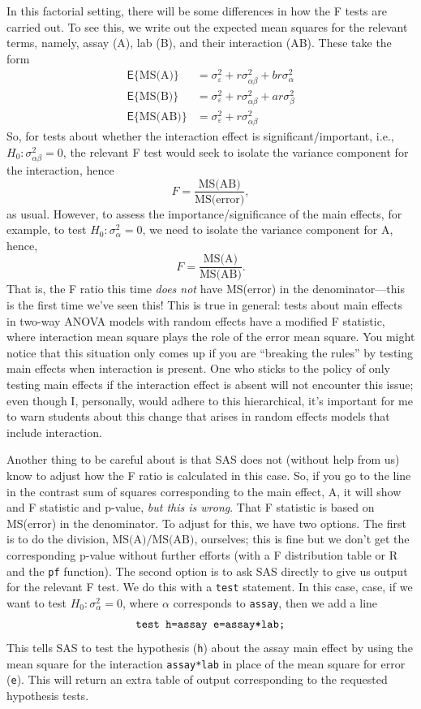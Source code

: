 \documentclass[a4paper, 12pt]{article}
\theoremstyle{plain}
\theoremstyle{definition}
\theoremstyle{remark}
\newcommand{\E}{\mathsf{E}}
\newcommand{\eps}{\varepsilon}
\begin{document}
In this factorial setting, there will be some differences in how the F tests are carried out.  To see this, we write out the expected mean squares for the relevant terms, namely, assay (A), lab (B), and their interaction (AB).  These take the form 
\begin{align*}
\E\{\text{MS(A)}\} & = \sigma_\eps^2 + r \sigma_{\alpha\beta}^2 + br \sigma_\alpha^2 \\
\E\{\text{MS(B)}\} & = \sigma_\eps^2 + r \sigma_{\alpha\beta}^2 + ar \sigma_\beta^2 \\
\E\{\text{MS(AB)}\} & = \sigma_\eps^2 + r \sigma_{\alpha\beta}^2 
\end{align*}
So, for tests about whether the interaction effect is significant/important, i.e., $H_0: \sigma_{\alpha\beta}^2 = 0$, the relevant F test would seek to isolate the variance component for the interaction, hence 
\[ F = \frac{\text{MS(AB)}}{\text{MS(error)}}, \]
as usual.  However, to assess the importance/significance of the main effects, for example, to test $H_0: \sigma_\alpha^2 = 0$, we need to isolate the variance component for A, hence, 
\[ F = \frac{\text{MS(A)}}{\text{MS(AB)}}. \]
That is, the F ratio this time {\em does not} have MS(error) in the denominator---this is the first time we've seen this!  This is true in general: tests about main effects in two-way ANOVA models with random effects have a modified F statistic, where interaction mean square plays the role of the error mean square.  You might notice that this situation only comes up if you are ``breaking the rules'' by testing main effects when interaction is present.  One who sticks to the policy of only testing main effects if the interaction effect is absent will not encounter this issue; even though I, personally, would adhere to this hierarchical, it's important for me to warn students about this change that arises in random effects models that include interaction.  

Another thing to be careful about is that SAS does not (without help from us) know to adjust how the F ratio is calculated in this case.  So, if you go to the line in the contrast sum of squares corresponding to the main effect, A, it will show and F statistic and p-value, {\em but this is wrong}.  That F statistic is based on MS(error) in the denominator.  To adjust for this, we have two options.  The first is to do the division, $\text{MS(A)}/\text{MS(AB)}$, ourselves; this is fine but we don't get the corresponding p-value without further efforts (with a F distribution table or R and the {\tt pf} function).  The second option is to ask SAS directly to give us output for the relevant F test.  We do this with a {\tt test} statement.  In this case, case, if we want to test $H_0: \sigma_\alpha^2 = 0$, where $\alpha$ corresponds to {\tt assay}, then we add a line 
\[ \text{\tt test h=assay e=assay*lab;} \]
This tells SAS to test the hypothesis ({\tt h}) about the assay main effect by using the mean square for the interaction {\tt assay*lab} in place of the mean square for error ({\tt e}).  This will return an extra table of output corresponding to the requested hypothesis tests.  
\end{document}
